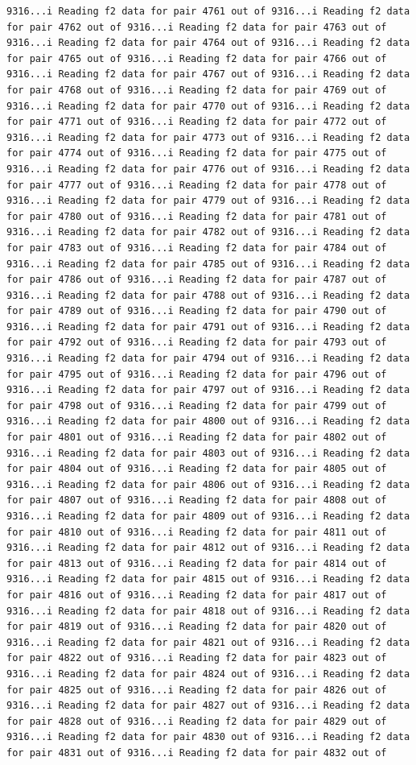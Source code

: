 \documentclass[
]{article}
\begin{document}
\begin{verbatim}
9316...i Reading f2 data for pair 4761 out of 9316...i Reading f2 data for pair 4762 out of 9316...i Reading f2 data for pair 4763 out of 9316...i Reading f2 data for pair 4764 out of 9316...i Reading f2 data for pair 4765 out of 9316...i Reading f2 data for pair 4766 out of 9316...i Reading f2 data for pair 4767 out of 9316...i Reading f2 data for pair 4768 out of 9316...i Reading f2 data for pair 4769 out of 9316...i Reading f2 data for pair 4770 out of 9316...i Reading f2 data for pair 4771 out of 9316...i Reading f2 data for pair 4772 out of 9316...i Reading f2 data for pair 4773 out of 9316...i Reading f2 data for pair 4774 out of 9316...i Reading f2 data for pair 4775 out of 9316...i Reading f2 data for pair 4776 out of 9316...i Reading f2 data for pair 4777 out of 9316...i Reading f2 data for pair 4778 out of 9316...i Reading f2 data for pair 4779 out of 9316...i Reading f2 data for pair 4780 out of 9316...i Reading f2 data for pair 4781 out of 9316...i Reading f2 data for pair 4782 out of 9316...i Reading f2 data for pair 4783 out of 9316...i Reading f2 data for pair 4784 out of 9316...i Reading f2 data for pair 4785 out of 9316...i Reading f2 data for pair 4786 out of 9316...i Reading f2 data for pair 4787 out of 9316...i Reading f2 data for pair 4788 out of 9316...i Reading f2 data for pair 4789 out of 9316...i Reading f2 data for pair 4790 out of 9316...i Reading f2 data for pair 4791 out of 9316...i Reading f2 data for pair 4792 out of 9316...i Reading f2 data for pair 4793 out of 9316...i Reading f2 data for pair 4794 out of 9316...i Reading f2 data for pair 4795 out of 9316...i Reading f2 data for pair 4796 out of 9316...i Reading f2 data for pair 4797 out of 9316...i Reading f2 data for pair 4798 out of 9316...i Reading f2 data for pair 4799 out of 9316...i Reading f2 data for pair 4800 out of 9316...i Reading f2 data for pair 4801 out of 9316...i Reading f2 data for pair 4802 out of 9316...i Reading f2 data for pair 4803 out of 9316...i Reading f2 data for pair 4804 out of 9316...i Reading f2 data for pair 4805 out of 9316...i Reading f2 data for pair 4806 out of 9316...i Reading f2 data for pair 4807 out of 9316...i Reading f2 data for pair 4808 out of 9316...i Reading f2 data for pair 4809 out of 9316...i Reading f2 data for pair 4810 out of 9316...i Reading f2 data for pair 4811 out of 9316...i Reading f2 data for pair 4812 out of 9316...i Reading f2 data for pair 4813 out of 9316...i Reading f2 data for pair 4814 out of 9316...i Reading f2 data for pair 4815 out of 9316...i Reading f2 data for pair 4816 out of 9316...i Reading f2 data for pair 4817 out of 9316...i Reading f2 data for pair 4818 out of 9316...i Reading f2 data for pair 4819 out of 9316...i Reading f2 data for pair 4820 out of 9316...i Reading f2 data for pair 4821 out of 9316...i Reading f2 data for pair 4822 out of 9316...i Reading f2 data for pair 4823 out of 9316...i Reading f2 data for pair 4824 out of 9316...i Reading f2 data for pair 4825 out of 9316...i Reading f2 data for pair 4826 out of 9316...i Reading f2 data for pair 4827 out of 9316...i Reading f2 data for pair 4828 out of 9316...i Reading f2 data for pair 4829 out of 9316...i Reading f2 data for pair 4830 out of 9316...i Reading f2 data for pair 4831 out of 9316...i Reading f2 data for pair 4832 out of 
\end{verbatim}
\end{document}
